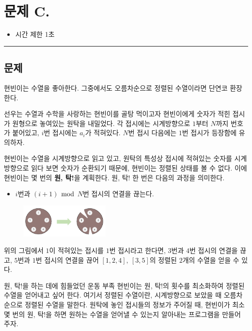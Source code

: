 \newpage
\section*{{\Large 문제 C.} }

\begin{itemize}
    \item 시간 제한 \tabto{2cm} 1초
\end{itemize}

\hrule

\subsection*{문제}

현빈이는 수열을 좋아한다. 그중에서도 오름차순으로 정렬된 수열이라면 단연코 환장한다.

선우는 수열과 수학을 사랑하는 현빈이를 골탕 먹이고자 현빈이에게 숫자가 적힌 접시가 원형으로 놓여있는 원탁을 내밀었다. 각 접시에는 시계방향으로 $1$부터 $N$까지 번호가 붙어있고, $i$번 접시에는 $a_{i}$가 적혀있다. $N$번 접시 다음에는 $1$번 접시가 등장함에 유의하자.

현빈이는 수열을 시계방향으로 읽고 있고, 원탁의 특성상 접시에 적혀있는 숫자를 시계방향으로 읽다 보면 숫자가 순환되기 때문에, 현빈이는 정렬된 상태를 볼 수 없다. 이에 현빈이는 몇 번의 \textbf{원, 탁!}을 계획한다. 원, 탁! 한 번은 다음의 과정을 의미한다.

\begin{itemize}
    \item $i$번과 $(i+1)$ $\bmod$ $N$번 접시의 연결을 끊는다.
\end{itemize}

\begin{figure}[h]
    \centering
    \includegraphics[width=0.4\textwidth]{problems/image/wontak.png}
\end{figure}

위의 그림에서 $1$이 적혀있는 접시를 $1$번 접시라고 한다면, $3$번과 $4$번 접시의 연결을 끊고, $5$번과 $1$번 접시의 연결을 끊어 $[1, 2, 4],\ [3, 5]$의 정렬된 $2$개의 수열을 얻을 수 있다.

원, 탁!을 하는 데에 힘들었던 운동 부족 현빈이는 원, 탁!의 횟수를 최소화하여 정렬된 수열을 얻어내고 싶어 한다. 여기서 정렬된 수열이란, 시계방향으로 보았을 때 오름차순으로 정렬된 수열을 말한다. 원탁에 놓인 접시들의 정보가 주어질 때, 현빈이가 최소 몇 번의 원, 탁!을 하면 원하는 수열을 얻어낼 수 있는지 알아내는 프로그램을 만들어 주자.

